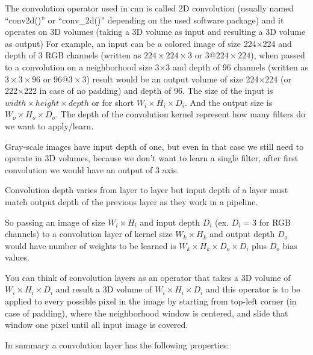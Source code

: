 The convolution operator used in \gls{cnn} is called 2D convolution
(usually named ``conv2d()'' or ``conv\_2d()'' depending on the used software package)
and it operates on 3D volumes (taking a 3D volume as input and resulting a 3D volume as output)
For example, an input can be a colored image of size 224×224 and depth of 3 RGB channels
(written as \(224×224×3\) or \(3@224×224\)\autocite{lecun1998gradient}),
when passed to a convolution on a neighborhood size 3×3 and depth of 96 channels (written as \(3×3×96\) or \(96@3×3\))
result would be an output volume of size 224×224 (or 222×222 in case of no padding) and depth of 96.
The size of the input is \(width\times height \times depth\) or for short \(W_i\times H_i\times D_i\).
And the output size is \(W_o\times H_o\times D_o\).
The depth of the convolution kernel represent how many filters do we want to apply/learn.

Gray-scale images have input depth of one, but even in that case we still need to operate in 3D volumes,
because we don't want to learn a single filter, after first convolution we would have an output of 3 axis.

Convolution depth varies from layer to layer but input depth of
a layer must match output depth of the previous layer as they work in a pipeline.

So passing an image of size \( W_i\times H_i \) and input depth \( D_i \) (ex. \( D_i=3 \) for RGB channels)
to a convolution layer of kernel size \(W_k\times H_k\) and output depth \(D_o\) would have number of weights
to be learned is \( W_k\times H_k \times D_o \times D_i \) plus \(D_o\) bias values.

You can think of convolution layers as an operator that takes a 3D volume of \(W_i\times H_i\times D_i\)
and result a 3D volume of \(W_i\times H_i\times D_i\) and this operator is to be applied to every possible pixel
in the image by starting from top-left corner (in case of padding), where the neighborhood window is centered,
and slide that window one pixel until all input image is covered. 

In summary a convolution layer has the following properties:

